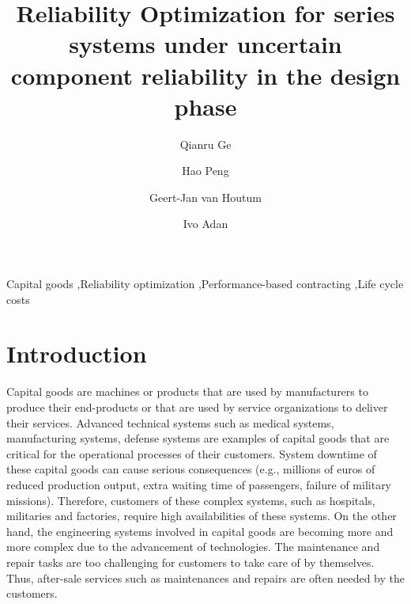\documentclass[preprint,12pt]{elsarticle}
\begin{document}
\nocite{*}

\begin{frontmatter}
\title{Reliability Optimization for series systems under uncertain component reliability in the design phase}
\author[label1]{Qianru Ge}
\author[label1]{Hao Peng}
\author[label1]{Geert-Jan van Houtum}
\author[label1]{Ivo Adan}
\address[label1]{Department of Industrial Engineering and Innovation Sciences, Eindhoven University of Technology, Eindhoven, The Netherlands}

\begin{abstract}
\end{abstract}

\begin{keyword}
Capital goods \sep Reliability optimization  \sep Performance-based contracting \sep Life cycle costs
\end{keyword}
\end{frontmatter}
\section{Introduction}
Capital goods are machines or products that are used by manufacturers to produce their end-products or that are used by service organizations to deliver their services. Advanced technical systems such as medical systems, manufacturing systems, defense systems are examples of capital goods that are critical for the operational processes of their customers. System downtime of these capital goods can cause serious consequences (e.g., millions of euros of reduced production output, extra waiting time of passengers, failure of military missions). Therefore, customers of these complex systems, such as hospitals, militaries and factories, require high availabilities of these systems. On the other hand, the engineering systems involved in capital goods are becoming more and more complex due to the advancement of technologies. The maintenance and repair tasks are too challenging for customers to take care of by themselves. Thus, after-sale services such as maintenances and repairs are often needed by the customers.
\end{document}

